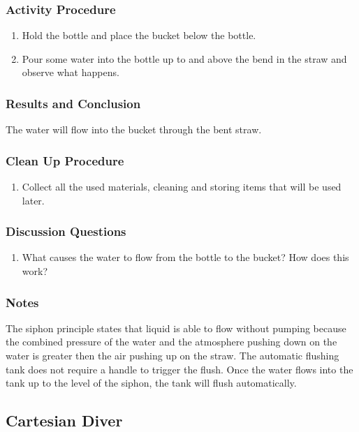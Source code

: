 \subsubsection*{Activity Procedure}
\begin{enumerate}
\item{Hold the bottle and place the bucket below the bottle.} 
\item{Pour some water into the bottle up to and above the bend in the straw and observe what happens.} 
\end{enumerate}

\subsubsection*{Results and Conclusion}
The water will flow into the bucket through the bent straw. 

\subsubsection*{Clean Up Procedure}
\begin{enumerate}
\item{Collect all the used materials, cleaning and storing items that will be used later.}
\end{enumerate}

\subsubsection*{Discussion Questions}
\begin{enumerate}
\item{What causes the water to flow from the bottle to the bucket? How does this work?}
\end{enumerate}

\subsubsection*{Notes}
The siphon principle states that liquid is able to flow without pumping because the combined pressure of the water and the atmosphere pushing down on the water is greater then the air pushing up on the straw. The automatic flushing tank does not require a handle to trigger the flush. Once the water flows into the tank up to the level of the siphon, the tank will flush automatically. 


\subsection{Cartesian Diver}

